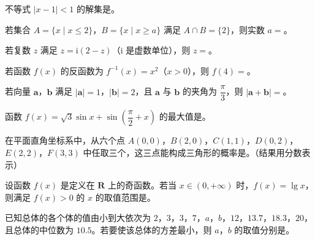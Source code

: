 


\begin{question}
不等式 $|x-1|<1$ 的解集是\gkblank{}。

\end{question}
\begin{question}
若集合 $A=\{x\mid x\leqslant2\}$，$B=\{x\mid x\geqslant a\}$ 满足 $A\cap B=\{2\}$，则实数 $a=$\gkblank{}。

\end{question}
\begin{question}
若复数 $z$ 满足 $z=\mathrm i(2-z)$（$\mathrm i$ 是虚数单位），则 $z=$\gkblank{}。

\end{question}
\begin{question}
若函数 $f(x)$ 的反函数为 $f^{-1}(x)=x^2$（$x>0$），则 $f(4)=$\gkblank{}。

\end{question}
\begin{question}
若向量 $\boldsymbol a$，$\boldsymbol b$ 满足 $|\boldsymbol a|=1$，$|\boldsymbol b|=2$，且 $\boldsymbol a$ 与 $\boldsymbol b$ 的夹角为 $\dfrac{\pi}3$，则 $|\boldsymbol a+\boldsymbol b|=$\gkblank{}。

\end{question}
\begin{question}
函数 $f(x)=\sqrt3\sin x+\sin\left(\dfrac{\pi}2+x\right)$ 的最大值是\gkblank{}。

\end{question}
\begin{question}
在平面直角坐标系中，从六个点 $A(0,0)$，$B(2,0)$，$C(1,1)$，$D(0,2)$，$E(2,2)$，$F(3,3)$ 中任取三个，这三点能构成三角形的概率是\gkblank{}。（结果用分数表示）

\end{question}
\begin{question}
设函数 $f(x)$ 是定义在 $\mathbf R$ 上的奇函数。若当 $x\in(0,+\infty)$ 时，$f(x)=\lg x$，则满足 $f(x)>0$ 的 $x$ 的取值范围是\gkblank{}。

\end{question}
\begin{question}
已知总体的各个体的值由小到大依次为 $2$，$3$，$3$，$7$，$a$，$b$，$12$，$13.7$，$18.3$，$20$，且总体的中位数为 $10.5$。若要使该总体的方差最小，则 $a$，$b$ 的取值分别是\gkblank{}。

\end{question}
